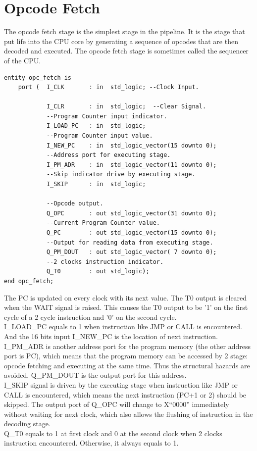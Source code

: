 \documentclass[12pt,a4paper]{report}
\begin{document}
\section{Opcode Fetch}
The opcode fetch stage is the simplest stage in the pipeline. It is the stage that put life into the CPU core by generating a sequence of opcodes that are then decoded and executed. The opcode fetch stage is sometimes called the sequencer of the CPU.
\begin{lstlisting}
entity opc_fetch is
    port (  I_CLK       : in  std_logic; --Clock Input.

            I_CLR       : in  std_logic;  --Clear Signal.
            --Program Counter input indicator.
            I_LOAD_PC   : in  std_logic;
            --Program Counter input value.
            I_NEW_PC    : in  std_logic_vector(15 downto 0);
            --Address port for executing stage.
            I_PM_ADR    : in  std_logic_vector(11 downto 0);
            --Skip indicator drive by executing stage.
            I_SKIP      : in  std_logic;

            --Opcode output.
            Q_OPC       : out std_logic_vector(31 downto 0);
            --Current Program Counter value.
            Q_PC        : out std_logic_vector(15 downto 0);
            --Output for reading data from executing stage.
            Q_PM_DOUT   : out std_logic_vector( 7 downto 0);
            --2 clocks instruction indicator.
            Q_T0        : out std_logic);
end opc_fetch;
\end{lstlisting}
The PC is updated on every clock with its next value. The T0 output is cleared when the WAIT signal is raised. This causes the T0 output to be '1' on the first cycle of a 2 cycle instruction and '0' on the second cycle.\\
I\_LOAD\_PC equals to 1 when instruction like JMP or CALL is encountered. And the 16 bits input I\_NEW\_PC is the location of next instruction. \\
I\_PM\_ADR is another address port for the program memory (the other address port is PC), which means that the program memory can be accessed by 2 stage: opcode fetching and executing at the same time. Thus the structural hazards are avoided. Q\_PM\_DOUT is the output port for this address.\\
I\_SKIP signal is driven by the executing stage when instruction like JMP or CALL is encountered, which means the next instruction (PC+1 or 2) should be skipped. The output port of Q\_OPC will change to X``0000'' immediately without waiting for next clock, which also allows the flushing of instruction in the decoding stage.\\
Q\_T0 equals to 1 at first clock and 0 at the second clock when 2 clocks instruction encountered. Otherwise, it always equals to 1.
\end{document}
